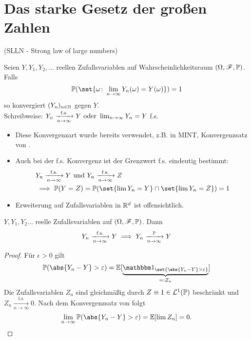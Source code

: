 ﻿\section{Das starke Gesetz der großen Zahlen}
(SLLN - Strong law of large numbers)\\
\begin{definition}
	Seien $Y,Y_1, Y_2, \dots$ reellen Zufallsvariablen auf Wahrscheinlichkeitsraum $(\O,\F,\P)$. Falls
	\begin{align*}
		\P(\set{\omega\colon \lim_{n\to \infty} Y_n(\omega) = Y(\omega)}) = 1
	\end{align*}
	so konvergiert $(Y_n)_{n\in \N}$  gegen $Y$.\\
	Schreibweise: $Y_n \xrightarrow[n \to \infty]{\text{f.s.}} Y \oder \lim_{n\to \infty} Y_n = Y$ f.s.
\end{definition}
\begin{*remark}
	\begin{itemize}
		\item Diese Konvergenzart wurde bereits verwendet, z.B. in MINT, Konvergenzsatz von .
		\item Auch bei der f.s. Konvergenz ist der Grenzwert f.s. eindeutig bestimmt:
		\begin{align*}
			&Y_n \xrightarrow[n \to \infty]{\text{f.s.}}Y \und Y_n \xrightarrow[n \to \infty]{\text{f.s.}}Z\\
			&\implies \P(Y=Z) = \P(\set{\lim Y_n = Y} \cap \set{\lim Y_n = Z}) = 1
		\end{align*}
		\item Erweiterung auf Zufallsvariablen in $\Rd$ ist offensichtlich.
	\end{itemize}
\end{*remark}
\begin{lemma}
	$Y,Y_1,Y_2 \dots$ reelle Zufallsvariablen auf $(\O,\F,\P)$. Dann
	\begin{align*}
		Y_n \xrightarrow[n \to \infty]{\text{f.s.}} Y \implies Y_n \xrightarrow[n \to \infty]{\P} Y
	\end{align*}
\end{lemma}
\begin{proof}
	Für $\epsilon > 0$ gilt
	\begin{align*}
		\P(\abs{Y_n - Y} > \epsilon) = \E[\underbrace{\indi_{\set{\abs{Y_n - Y}> \epsilon}}}_{=: Z_n}]
	\end{align*}
	Die Zufallsvariablen $Z_n$ sind gleichmäßig durch $Z \equiv 1 \in \Ln{1}(\P)$ beschränkt und $Z_n \xrightarrow[n \to \infty]{\text{f.s.}} 0$. Nach dem Konvergenzsatz von  folgt
	\begin{align*}
		\lim_{n\to \infty} \P(\abs{Y_n - Y}> \epsilon) = \E[\lim Z_n] = 0.
	\end{align*}
\end{proof}

